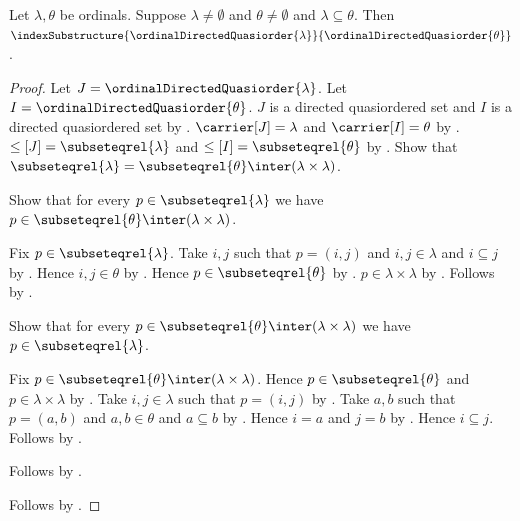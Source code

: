 \begin{theorem}\label{ordinal_index_substructure}
    Let $\lambda,\theta$ be ordinals.
    Suppose $\lambda\neq\emptyset$ and $\theta\neq\emptyset$ and
        $\lambda\subseteq\theta$.
    Then $\indexSubstructure
        {\ordinalDirectedQuasiorder{\lambda}}
        {\ordinalDirectedQuasiorder{\theta}}$.
\end{theorem}
\begin{proof}
    Let $J=\ordinalDirectedQuasiorder{\lambda}$.
    Let $I=\ordinalDirectedQuasiorder{\theta}$.
    $J$ is a directed quasiordered set and
        $I$ is a directed quasiordered set by
        .
    $\carrier[J]=\lambda$ and $\carrier[I]=\theta$ by
        .
    $\leq[J]=\subseteqrel{\lambda}$ and
        $\leq[I]=\subseteqrel{\theta}$ by
        .
    Show that $\subseteqrel{\lambda}
        =\subseteqrel{\theta}\inter(\lambda\times\lambda)$.
    \begin{subproof}
        Show that for every $p\in\subseteqrel{\lambda}$ we have
            $p\in\subseteqrel{\theta}\inter
                (\lambda\times\lambda)$.
        \begin{subproof}
            Fix $p\in\subseteqrel{\lambda}$.
            Take $i,j$ such that $p=(i,j)$ and $i,j\in\lambda$ and
                $i\subseteq j$ by .
            Hence $i,j\in\theta$ by .
            Hence $p\in\subseteqrel{\theta}$ by
                .
            $p\in\lambda\times\lambda$ by
                .
            Follows by .
        \end{subproof}
        Show that for every
            $p\in\subseteqrel{\theta}\inter(\lambda\times\lambda)$
            we have $p\in\subseteqrel{\lambda}$.
        \begin{subproof}
            Fix $p\in\subseteqrel{\theta}\inter
                (\lambda\times\lambda)$.
            Hence $p\in\subseteqrel{\theta}$ and
                $p\in\lambda\times\lambda$ by .
            Take $i,j\in\lambda$ such that $p=(i,j)$ by
                .
            Take $a,b$ such that $p=(a,b)$ and $a,b\in\theta$ and
                $a\subseteq b$ by .
            Hence $i=a$ and $j=b$ by .
            Hence $i\subseteq j$.
            Follows by .
        \end{subproof}
        Follows by .
    \end{subproof}
    Follows by .
\end{proof}
